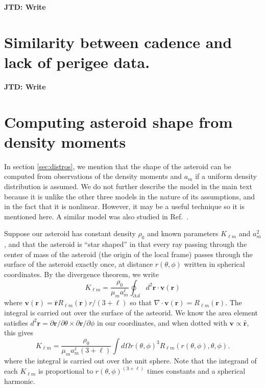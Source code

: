 \documentclass[fleqn,usenatbib]{mnras}
\newcommand{\jtd}[1]{ {\bf{\color{red} JTD: #1}} }
\newcommand{\unit}[1]{\bm{\hat{#1}}}
\begin{document}
\jtd{Write}



\section{Similarity between cadence and lack of perigee data.}
\label{app:cadence-perigee-test}

\jtd{Write}



\section{Computing asteroid shape from density moments}
\label{app:find-surface}

In section \ref{sec:distros}, we mention that the shape of the asteroid can be computed from observations of the density moments and $a_m$ if a uniform density distribution is assumed. We do not further describe the model in the main text because it is unlike the other three models in the nature of its assumptions, and in the fact that it is nonlinear. However, it may be a useful technique so it is mentioned here. A similar model was also studied in Ref.~\cite{BAXANSKY2007756}.

Suppose our asteroid has constant density $\rho_0$ and known parameters $K_{\ell m}$ and $a_m^2$, and that the asteroid is ``star shaped'' in that every ray passing through the center of mass of the asteroid (the origin of the local frame) passes through the surface of the asteroid exactly once, at distance $r(\theta, \phi)$ written in spherical coordinates. By the divergence theorem, we write
\begin{equation}
  K_{\ell m} = \frac{\rho_0}{\mu_m a_m^\ell} \oint_{\partial \mathcal{A}} d^2 \bm r \cdot \bm v (\bm r)
\end{equation}
where $\bm v (\bm r) = \unit r R_{\ell m} (\bm r) r / (3+\ell) $ so that $\nabla \cdot \bm v(\bm r) = R_{\ell m}(\bm r)$. The integral is carried out over the surface of the asteorid. We know the area element satisfies $d^2 \bm r = \partial \bm r / \partial \theta \times \partial \bm r / \partial \phi$ in our coordinates, and when dotted with $\bm v \propto \unit r$, this gives
\begin{equation}
  K_{\ell m} = \frac{\rho_0 }{\mu_m a_m^\ell (3 + \ell)} \int d\Omega r(\theta, \phi)^3 R_{\ell m}(r(\theta, \phi), \theta, \phi).
  \label{eqn:surface-klm}
\end{equation}
where the integral is carried out over the unit sphere. Note that the integrand of each $K_{\ell m}$ is proportional to $r(\theta, \phi)^{(3+\ell)}$ times constants and a spherical harmonic.
\end{document}
